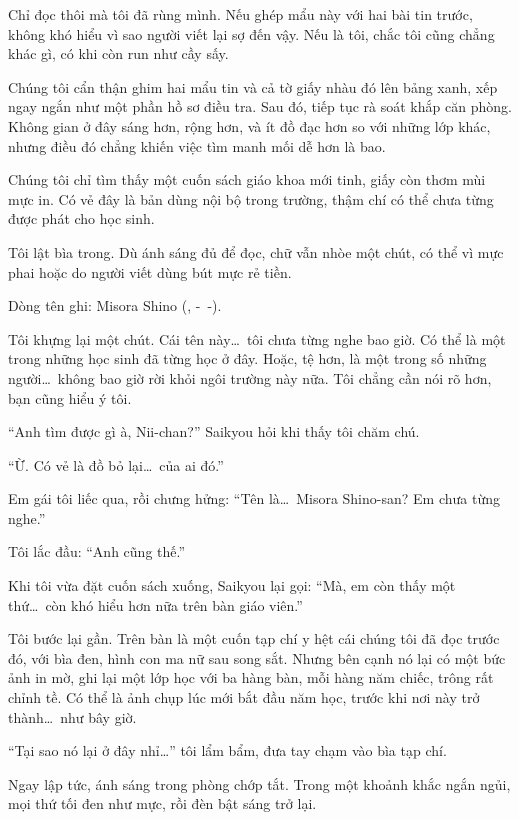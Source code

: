 \documentclass[../main.tex]{subfiles}
\begin{document}
Chỉ đọc thôi mà tôi đã rùng mình. Nếu ghép mẩu này với hai bài tin trước, không khó hiểu vì sao người viết lại sợ đến vậy. Nếu là tôi, chắc tôi cũng chẳng khác gì, có khi còn run như cầy sấy.

Chúng tôi cẩn thận ghim hai mẩu tin và cả tờ giấy nhàu đó lên bảng xanh, xếp ngay ngắn như một phần hồ sơ điều tra. Sau đó, tiếp tục rà soát khắp căn phòng. Không gian ở đây sáng hơn, rộng hơn, và ít đồ đạc hơn so với những lớp khác, nhưng điều đó chẳng khiến việc tìm manh mối dễ hơn là bao.

Chúng tôi chỉ tìm thấy một cuốn sách giáo khoa mới tinh, giấy còn thơm mùi mực in. Có vẻ đây là bản dùng nội bộ trong trường, thậm chí có thể chưa từng được phát cho học sinh.

Tôi lật bìa trong. Dù ánh sáng đủ để đọc, chữ vẫn nhòe một chút, có thể vì mực phai hoặc do người viết dùng bút mực rẻ tiền.

Dòng tên ghi: Misora Shino (, -\ -).

Tôi khựng lại một chút. Cái tên này\dots\ tôi chưa từng nghe bao giờ. Có thể là một trong những học sinh đã từng học ở đây. Hoặc, tệ hơn, là một trong số những người\dots\ không bao giờ rời khỏi ngôi trường này nữa. Tôi chẳng cần nói rõ hơn, bạn cũng hiểu ý tôi.

``Anh tìm được gì à, Nii-chan?'' Saikyou hỏi khi thấy tôi chăm chú.

``Ừ. Có vẻ là đồ bỏ lại\dots\ của ai đó.''

Em gái tôi liếc qua, rồi chưng hửng: ``Tên là\dots\ Misora Shino-san? Em chưa từng nghe.''

Tôi lắc đầu: ``Anh cũng thế.''

Khi tôi vừa đặt cuốn sách xuống, Saikyou lại gọi: ``Mà, em còn thấy một thứ\dots\ còn khó hiểu hơn nữa trên bàn giáo viên.''

Tôi bước lại gần. Trên bàn là một cuốn tạp chí y hệt cái chúng tôi đã đọc trước đó, với bìa đen, hình con ma nữ sau song sắt. Nhưng bên cạnh nó lại có một bức ảnh in mờ, ghi lại một lớp học với ba hàng bàn, mỗi hàng năm chiếc, trông rất chỉnh tề. Có thể là ảnh chụp lúc mới bắt đầu năm học, trước khi nơi này trở thành\dots\ như bây giờ.

``Tại sao nó lại ở đây nhỉ\dots'' tôi lẩm bẩm, đưa tay chạm vào bìa tạp chí.

Ngay lập tức, ánh sáng trong phòng chớp tắt. Trong một khoảnh khắc ngắn ngủi, mọi thứ tối đen như mực, rồi đèn bật sáng trở lại.
\end{document}
